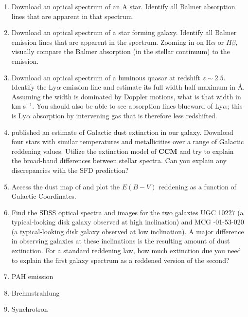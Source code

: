 \begin{enumerate}
\item Download an optical spectrum of an A star. Identify 
  all Balmer absorption lines that are apparent in that spectrum.
\item Download an optical spectrum of a star forming galaxy. Identify
all Balmer emission lines that are apparent in the spectrum. Zooming
in on H$\alpha$ or $H\beta$, visually compare the Balmer absorption
(in the stellar continuum) to the emission.
\item Download an optical spectrum of a luminous quasar at redshift $z\sim
2.5$. Identify the Ly$\alpha$ emission line and estimate its full
width half maximum in \AA. Assuming the width is dominated by Doppler
motions, what is that width in km s$^{-1}$. You should also be able to
see absorption lines blueward of Ly$\alpha$; this is Ly$\alpha$
absorption by intervening gas that is therefore less redshifted.
\item \citet{schlegel98a} published an estimate of Galactic dust
extinction in our galaxy. Download four stars with similar
temperatures and metallicities over a range of Galactic reddening
values. Utilize the extinction model of {\bf CCM} and try to explain
the broad-band differences between stellar spectra. Can you explain
any discrepancies with the SFD prediction?
\item Access the dust map of \citet{schlegel98a} and plot the $E(B-V)$
    reddening as a function of Galactic Coordinates. 
\item Find the SDSS optical spectra and images for the two galaxies
UGC 10227 (a typical-looking disk galaxy observed at high inclination)
and MCG -01-53-020 (a typical-looking disk galaxy observed at low
inclination). A major difference in observing galaxies at these
inclinations is the resulting amount of dust extinction. For a
standard reddening law, how much extinction due you need to explain
the first galaxy spectrum as a reddened version of the second?
\item PAH emission                                     
\item Brehmstrahlung
\item Synchrotron
\end{enumerate}


  
